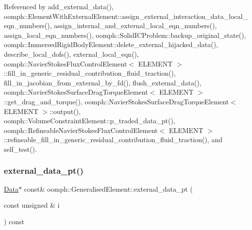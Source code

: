 Referenced by add\+\_\+external\+\_\+data(), oomph\+::\+Element\+With\+External\+Element\+::assign\+\_\+external\+\_\+interaction\+\_\+data\+\_\+local\+\_\+eqn\+\_\+numbers(), assign\+\_\+internal\+\_\+and\+\_\+external\+\_\+local\+\_\+eqn\+\_\+numbers(), assign\+\_\+local\+\_\+eqn\+\_\+numbers(), oomph\+::\+Solid\+I\+C\+Problem\+::backup\+\_\+original\+\_\+state(), oomph\+::\+Immersed\+Rigid\+Body\+Element\+::delete\+\_\+external\+\_\+hijacked\+\_\+data(), describe\+\_\+local\+\_\+dofs(), external\+\_\+local\+\_\+eqn(), oomph\+::\+Navier\+Stokes\+Flux\+Control\+Element$<$ E\+L\+E\+M\+E\+N\+T $>$\+::fill\+\_\+in\+\_\+generic\+\_\+residual\+\_\+contribution\+\_\+fluid\+\_\+traction(), fill\+\_\+in\+\_\+jacobian\+\_\+from\+\_\+external\+\_\+by\+\_\+fd(), flush\+\_\+external\+\_\+data(), oomph\+::\+Navier\+Stokes\+Surface\+Drag\+Torque\+Element$<$ E\+L\+E\+M\+E\+N\+T $>$\+::get\+\_\+drag\+\_\+and\+\_\+torque(), oomph\+::\+Navier\+Stokes\+Surface\+Drag\+Torque\+Element$<$ E\+L\+E\+M\+E\+N\+T $>$\+::output(), oomph\+::\+Volume\+Constraint\+Element\+::p\+\_\+traded\+\_\+data\+\_\+pt(), oomph\+::\+Refineable\+Navier\+Stokes\+Flux\+Control\+Element$<$ E\+L\+E\+M\+E\+N\+T $>$\+::refineable\+\_\+fill\+\_\+in\+\_\+generic\+\_\+residual\+\_\+contribution\+\_\+fluid\+\_\+traction(), and self\+\_\+test().

\mbox{\label{classoomph_1_1GeneralisedElement_a59570d8174b7123613d8cbfe6957a21c}} 
\subsubsection{\texorpdfstring{external\+\_\+data\+\_\+pt()}{external\_data\_pt()}\hspace{0.1cm}{\footnotesize\ttfamily [2/2]}}
{\footnotesize\ttfamily \hyperlink{classoomph_1_1Data}{Data}$\ast$ const\& oomph\+::\+Generalised\+Element\+::external\+\_\+data\+\_\+pt (\begin{DoxyParamCaption}\item[{const unsigned \&}]{i }\end{DoxyParamCaption}) const\hspace{0.3cm}{\ttfamily [inline]}}



